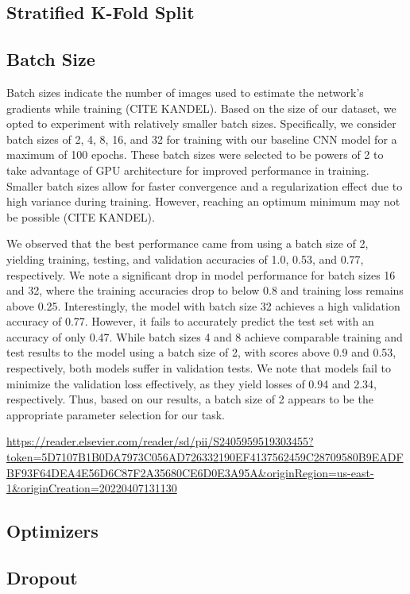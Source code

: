 \documentclass{article}
\begin{document}
\subsection{Stratified K-Fold Split}
\subsection{Batch Size}
Batch sizes indicate the number of images used to estimate the network’s gradients while training (CITE KANDEL). Based on the size of our dataset, we opted to experiment with relatively smaller batch sizes. Specifically, we consider batch sizes of 2, 4, 8, 16, and 32 for training with our baseline CNN model for a maximum of 100 epochs. These batch sizes were selected to be powers of 2 to take advantage of GPU architecture for improved performance in training. Smaller batch sizes allow for faster convergence and a regularization effect due to high variance during training. However, reaching an optimum minimum may not be possible (CITE KANDEL). 

We observed that the best performance came from using a batch size of 2, yielding training, testing, and validation accuracies of 1.0, 0.53, and 0.77, respectively. We note a significant drop in model performance for batch sizes 16 and 32, where the training accuracies drop to below 0.8 and training loss remains above 0.25. Interestingly, the model with batch size 32 achieves a high validation accuracy of 0.77. However, it fails to accurately predict the test set with an accuracy of only 0.47. While batch sizes 4 and 8 achieve comparable training and test results to the model using a batch size of 2, with scores above 0.9 and 0.53, respectively, both models suffer in validation tests. We note that models fail to minimize the validation loss effectively, as they yield losses of 0.94 and 2.34, respectively. Thus, based on our results, a batch size of 2 appears to be the appropriate parameter selection for our task.

\url{https://reader.elsevier.com/reader/sd/pii/S2405959519303455?token=5D7107B1B0DA7973C056AD726332190EF4137562459C28709580B9EADFBF93F64DEA4E56D6C87F2A35680CE6D0E3A95A&originRegion=us-east-1&originCreation=20220407131130}

\subsection{Optimizers}
\subsection{Dropout}
\end{document}
